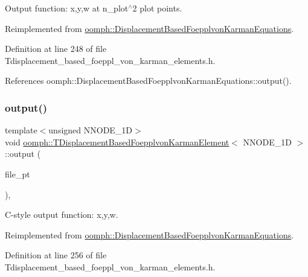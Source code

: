 Output function\+: x,y,w at n\+\_\+plot$^\wedge$2 plot points. 



Reimplemented from \hyperlink{classoomph_1_1DisplacementBasedFoepplvonKarmanEquations_a675597ddd788e92dd6fb8d3bfed01c5b}{oomph\+::\+Displacement\+Based\+Foepplvon\+Karman\+Equations}.



Definition at line 248 of file Tdisplacement\+\_\+based\+\_\+foeppl\+\_\+von\+\_\+karman\+\_\+elements.\+h.



References oomph\+::\+Displacement\+Based\+Foepplvon\+Karman\+Equations\+::output().

\mbox{\label{classoomph_1_1TDisplacementBasedFoepplvonKarmanElement_a5558c5bd6365deda6a93d6eae19f22d0}} 
\subsubsection{\texorpdfstring{output()}{output()}\hspace{0.1cm}{\footnotesize\ttfamily [3/4]}}
{\footnotesize\ttfamily template$<$unsigned N\+N\+O\+D\+E\+\_\+1D$>$ \\
void \hyperlink{classoomph_1_1TDisplacementBasedFoepplvonKarmanElement}{oomph\+::\+T\+Displacement\+Based\+Foepplvon\+Karman\+Element}$<$ N\+N\+O\+D\+E\+\_\+1D $>$\+::output (\begin{DoxyParamCaption}\item[{F\+I\+LE $\ast$}]{file\+\_\+pt }\end{DoxyParamCaption})\hspace{0.3cm}{\ttfamily [inline]}, {\ttfamily [virtual]}}



C-\/style output function\+: x,y,w. 



Reimplemented from \hyperlink{classoomph_1_1DisplacementBasedFoepplvonKarmanEquations_ac969427e1333e212f74e5d2833d1c1b7}{oomph\+::\+Displacement\+Based\+Foepplvon\+Karman\+Equations}.



Definition at line 256 of file Tdisplacement\+\_\+based\+\_\+foeppl\+\_\+von\+\_\+karman\+\_\+elements.\+h.




